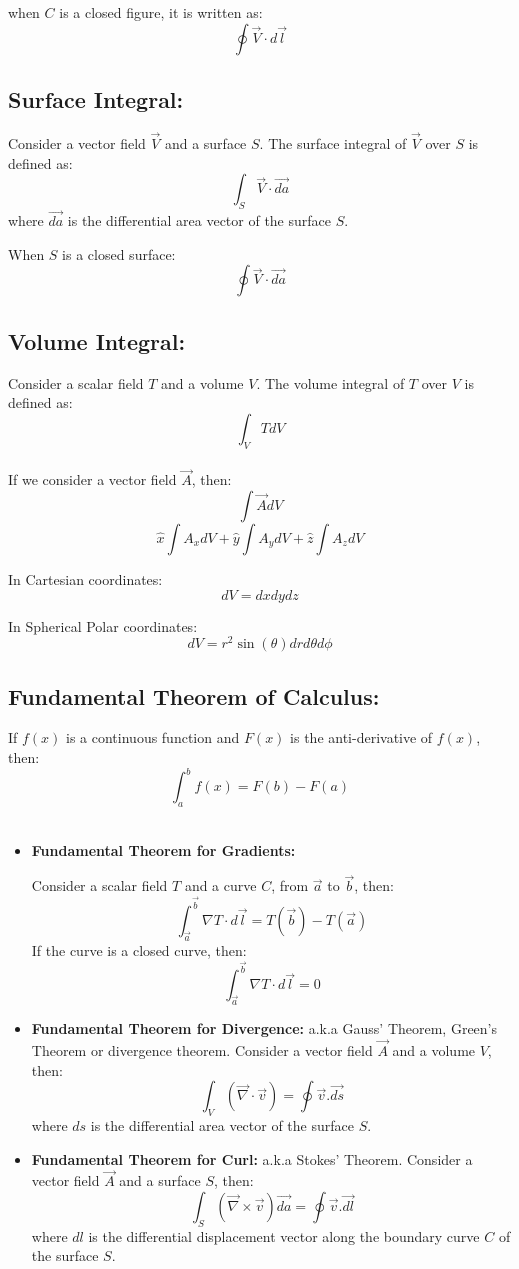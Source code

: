 \documentclass{article}
\begin{document}
when $C$ is a closed figure, it is written as:
\[\oint \vec{V} \cdot d\vec{l}\]
\subsection{Surface Integral: }
Consider a vector field $\vec{V}$ and a surface $S$. The surface integral of $\vec{V}$ over $S$ is defined as:
\[\int_{S} \vec{V}\cdot \vec{da}\]
where $\vec{da}$ is the differential area vector of the surface $S$.

When $S$ is a closed surface:
\[\oint \vec{V}\cdot\vec{da}\]

\subsection{Volume Integral: }
Consider a scalar field $T$ and a volume $V$. The volume integral of $T$ over $V$ is defined as:
\[\int_{V} T dV\]
\\
If we consider a vector field $\vec{A}$, then:
\[\int \vec{A} dV\]
\[\hat{x} \int A_x dV + \hat{y} \int A_y dV + \hat{z} \int A_z dV\]

In Cartesian coordinates:
\[dV = dx dy dz\]

In Spherical Polar coordinates:
\[dV = r^2 \sin(\theta) dr d\theta d\phi\]

\subsection{Fundamental Theorem of Calculus: }
If $f(x)$ is a continuous function and $F(x)$ is the anti-derivative of $f(x)$, then:
\[\int_{a}^{b} f(x) = F(b) - F(a)\]
\\

\begin{itemize}
	\item \textbf{Fundamental Theorem for Gradients: }

	      Consider a scalar field $T$ and a curve $C$, from $\vec{a}$ to $\vec{b}$, then:
	      \[\int_{\vec{a}}^{\vec{b}} \nabla T \cdot d\vec{l} = T(\vec{b}) - T(\vec{a})\]
	      If the curve is a closed curve, then:
	      \[\int_{\vec{a}}^{\vec{b}} \nabla T \cdot d\vec{l} = 0\]

	\item \textbf{Fundamental Theorem for Divergence: } a.k.a Gauss' Theorem, Green's Theorem or divergence theorem.
	      Consider a vector field $\vec{A}$ and a volume $V$, then:
	      \[\int_{V}\left(\vec{\nabla} \cdot \vec{v}\right) = \oint \vec{v}.\vec{ds}\]
	      where $ds$  is the differential area vector of the surface $S$.

	\item \textbf{Fundamental Theorem for Curl: } a.k.a Stokes' Theorem.
	      Consider a vector field $\vec{A}$ and a surface $S$, then:
	      \[\int_{S}\left(\vec{\nabla} \times \vec{v}\right) \vec{da}= \oint \vec{v}.\vec{dl}\]
	      where $dl$  is the differential displacement vector along the boundary curve $C$ of the surface $S$.

\end{itemize}
\end{document}
